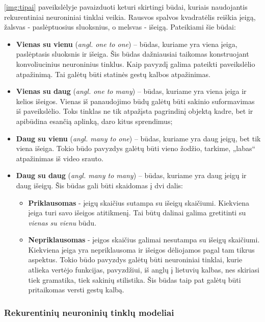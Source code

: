 \documentclass{VUMIFPSbakalaurinis}
\begin{document}
\ref{img:tipai} paveikslėlyje pavaizduoti keturi skirtingi būdai, kuriais naudojantis rekurentiniai neuroniniai tinklai veikia. Rausvos spalvos kvadratėlis reiškia įeigą, žalsvas - paslėptuosius sluoksnius, o melsvas - išeigą. Pateikiami šie būdai:

\begin{itemize}
	\item \textbf{Vienas su vienu} (\textit{angl. one to one}) – būdas, kuriame yra viena įeiga, paslėptasis sluoksnis ir išeiga. Šis būdas dažniausiai taikomas konstruojant konvoliucinius neuroninius tinklus. Kaip pavyzdį galima pateikti paveikslėlio atpažinimą. Tai galėtų būti statinės gestų kalbos atpažinimas.
	\item \textbf{Vienas su daug} (\textit{angl. one to many}) – būdas, kuriame yra viena įeiga ir kelios išeigos. Vienas iš panaudojimo būdų galėtų būti sakinio suformavimas iš paveikslėlio. Toks tinklas ne tik atpažįsta pagrindinį objektą kadre, bet ir apibūdina esančią aplinką, daro kitus sprendimus;
	\item \textbf{Daug su vienu} (\textit{angl. many to one}) – būdas, kuriame yra daug įeigų, bet tik viena išeiga. Tokio būdo pavyzdys galėtų būti vieno žodžio, tarkime, „labas“ atpažinimas iš video srauto.
	\item \textbf{Daug su daug} (\textit{angl. many to many}) – būdas, kuriame yra daug įeigų ir daug išeigų. Šis būdas gali būti skaidomas į dvi dalis:
	\begin{itemize}
		\item \textbf{Priklausomas} - įeigų skaičius sutampa su išeigų skaičiumi. Kiekviena įeiga turi savo išeigos atitikmenį. Tai būtų dalinai galima gretitinti su \textit{vienas su vienu} būdu.
		\item \textbf{Nepriklausomas} - įeigos skaičius galimai nesutampa su išeigų skaičiumi. Kiekviena įeiga yra nepriklausoma ir išeigos dėliojamos pagal tam tikrus aspektus. Tokio būdo pavyzdys galėtų būti neuroniniai tinklai, kurie atlieka vertėjo funkcijas, pavyzdžiui, iš anglų į lietuvių kalbas, nes skiriasi tiek gramatika, tiek sakinių stilistika. Šis būdas taip pat galėtų būti pritaikomas versti gestų kalbą.
	\end{itemize}
\end{itemize}

\subsubsection{Rekurentinių neuroninių tinklų modeliai}
\end{document}
